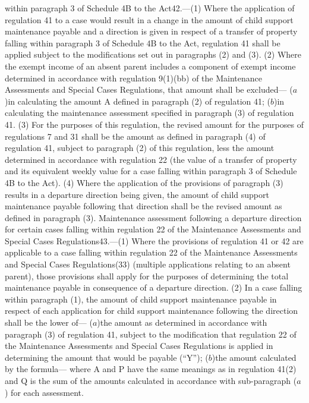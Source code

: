 \documentclass[a4paper]{article}
\begin{document}
within paragraph 3 of Schedule 4B to the Act42.—(1) Where the application of
regulation 41 to a case would result in a change in the amount of child support
maintenance payable and a direction is given in respect of a transfer of
property falling within paragraph 3 of Schedule 4B to the Act, regulation 41
shall be applied subject to the modifications set out in paragraphs (2) and (3).
(2) Where the exempt income of an absent parent includes a component of exempt
income determined in accordance with regulation 9(1)(bb) of the Maintenance
Assessments and Special Cases Regulations, that amount shall be excluded—
($a$)in calculating the amount A defined in paragraph (2) of regulation 41;
($b$)in calculating the maintenance assessment specified in paragraph (3) of
regulation 41.
(3) For the purposes of this regulation, the revised amount for the purposes of
regulations 7 and 31 shall be the amount as defined in paragraph (4) of
regulation 41, subject to paragraph (2) of this regulation, less the amount
determined in accordance with regulation 22 (the value of a transfer of property
and its equivalent weekly value for a case falling within paragraph 3 of
Schedule 4B to the Act).
(4) Where the application of the provisions of paragraph (3) results in a
departure direction being given, the amount of child support maintenance payable
following that direction shall be the revised amount as defined in paragraph
(3).
Maintenance assessment following a departure direction for certain cases falling
within regulation 22 of the Maintenance Assessments and Special Cases
Regulations43.—(1) Where the provisions of regulation 41 or 42 are applicable to
a case falling within regulation 22 of the Maintenance Assessments and Special
Cases Regulations(33) (multiple applications relating to an absent parent),
those provisions shall apply for the purposes of determining the total
maintenance payable in consequence of a departure direction.
(2) In a case falling within paragraph (1), the amount of child support
maintenance payable in respect of each application for child support maintenance
following the direction shall be the lower of—
($a$)the amount as determined in accordance with paragraph (3) of regulation 41,
subject to the modification that regulation 22 of the Maintenance Assessments
and Special Cases Regulations is applied in determining the amount that would be
payable (“Y”);
($b$)the amount calculated by the formula—
where A and P have the same meanings as in regulation 41(2) and Q is the sum of
the amounts calculated in accordance with sub-paragraph ($a$) for each assessment.
\end{document}
